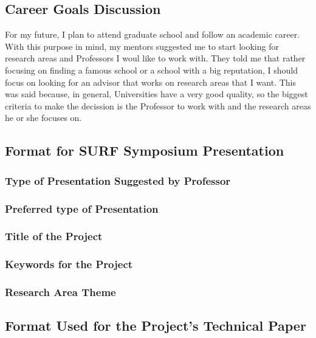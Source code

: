 \documentclass[a4paper]{journal}
\begin{document}
\subsection{Career Goals Discussion}

For my future, I plan to attend graduate school and follow an academic career. With this purpose in mind, my mentors suggested me to start looking for research areas and Professors I woul like to work with. They told me that rather focusing on finding a famous school or a school with a big reputation, I should focus on looking for an advisor that works on research areas that I want. This was said because, in general, Universities have a very good quality, so the biggest criteria to make the decission is the Professor to work with and the research areas he or she focuses on.

\subsection{Format for SURF Symposium Presentation}
\subsubsection{Type of Presentation Suggested by Professor}
\subsubsection{Preferred type of Presentation}
\subsubsection{Title of the Project}
\subsubsection{Keywords for the Project}
\subsubsection{Research Area Theme}
\subsection{Format Used for the Project's Technical Paper}
\end{document}
